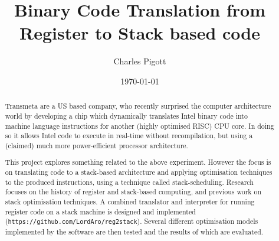 \documentclass[11pt,a4paper,notitlepage]{report}
\title{Binary Code Translation from Register to Stack based code}
\author{Charles Pigott}
\date{\today}
\begin{document}
\maketitle

\begin{abstract}
  Transmeta are a US based company, who recently surprised the computer
  architecture world by developing a chip which dynamically translates Intel
  binary code into machine language instructions for another (highly optimised
  RISC) CPU core. In doing so it allows Intel code to execute in real-time
  without recompilation, but using a (claimed) much more power-efficient
  processor architecture.

  This project explores something related to the above experiment. However the
  focus is on translating code to a stack-based architecture and applying
  optimisation techniques to the produced instructions, using a technique called
  stack-scheduling. Research focuses on the history of register and stack-based
  computing, and previous work on stack optimisation techniques. A combined
  translator and interpreter for running register code on a stack machine is
  designed and implemented (\texttt{https://github.com/LordAro/reg2stack}).
  Several different optimisation models implemented by the software are then
  tested and the results of which are evaluated.
\end{abstract}

\cleardoublepage%

\tableofcontents








\small\printbibliography%
\clearpage

\appendix

\end{document}
